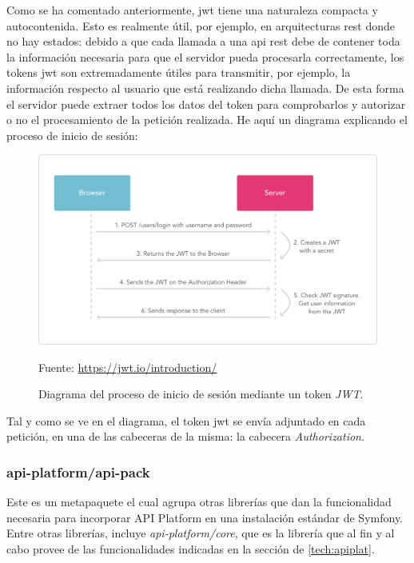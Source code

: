 Como se ha comentado anteriormente, \gls{jwt} tiene una naturaleza compacta y
autocontenida. Esto es realmente útil, por ejemplo, en arquitecturas \gls{rest}
donde no hay estados: debido a que cada llamada a una \gls{api} \gls{rest} debe
de contener toda la información necesaria para que el servidor pueda procesarla
correctamente, los tokens \gls{jwt} son extremadamente útiles para transmitir,
por ejemplo, la información respecto al usuario que está realizando dicha
llamada. De esta forma el servidor puede extraer todos los datos del token para
comprobarlos y autorizar o no el procesamiento de la petición realizada. He
aquí un diagrama explicando el proceso de inicio de sesión:

\begin{figure}[h]
    \center
    \includegraphics[scale=0.2]{img/jwt-diagram}
    \caption{Diagrama del proceso de inicio de sesión mediante un token
      \textit{JWT}.}
    Fuente: \url{https://jwt.io/introduction/}
\end{figure}

Tal y como se ve en el diagrama, el token \gls{jwt} se envía adjuntado en cada
petición, en una de las cabeceras de la misma: la cabecera
\textit{Authorization}.

\subsubsection{api-platform/api-pack}
Este es un metapaquete el cual agrupa otras librerías que dan la funcionalidad
necesaria para incorporar API Platform en una instalación estándar de Symfony.
Entre otras librerías, incluye \textit{api-platform/core}, que es la librería
que al fin y al cabo provee de las funcionalidades indicadas en la sección de
 \ref{tech:apiplat}.
